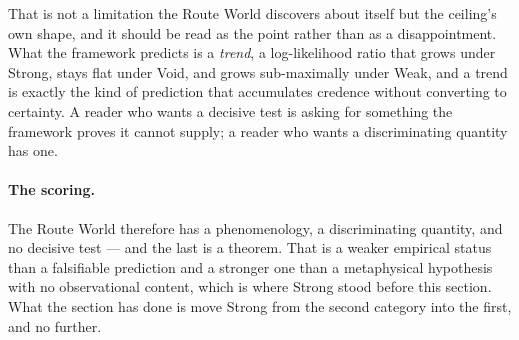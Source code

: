 \documentclass[11pt]{article}
\numberwithin{equation}{section}
\theoremstyle{plain}
\theoremstyle{definition}
\theoremstyle{remark}
\begin{document}
That is not a limitation the Route World discovers about itself but the
ceiling's own shape, and it should be read as the point rather than as a
disappointment. What the framework predicts is a \emph{trend}, a
log-likelihood ratio that grows under Strong, stays flat under Void, and
grows sub-maximally under Weak, and a trend is exactly the kind of
prediction that accumulates credence without converting to certainty. A
reader who wants a decisive test is asking for something the framework
proves it cannot supply; a reader who wants a discriminating quantity has
one.

\paragraph{The scoring.} The Route World therefore has a phenomenology, a
discriminating quantity, and no decisive test --- and the last is a
theorem. That is a weaker empirical status than a falsifiable prediction
and a stronger one than a metaphysical hypothesis with no observational
content, which is where Strong stood before this section. What the
section has done is move Strong from the second category into the first,
and no further.
\end{document}
